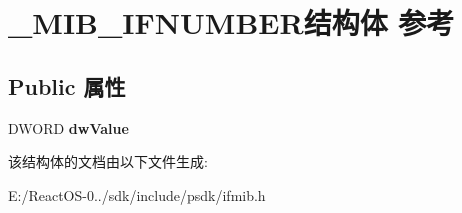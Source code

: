 \hypertarget{struct___m_i_b___i_f_n_u_m_b_e_r}{}\section{\+\_\+\+M\+I\+B\+\_\+\+I\+F\+N\+U\+M\+B\+E\+R结构体 参考}
\label{struct___m_i_b___i_f_n_u_m_b_e_r}
\subsection*{Public 属性}
\begin{DoxyCompactItemize}
\item 
\mbox{\label{struct___m_i_b___i_f_n_u_m_b_e_r_aff4c02cd7c7302eb97072c01867913cc}} 
D\+W\+O\+RD {\bfseries dw\+Value}
\end{DoxyCompactItemize}


该结构体的文档由以下文件生成\+:\begin{DoxyCompactItemize}
\item 
E\+:/\+React\+O\+S-\/0../sdk/include/psdk/ifmib.\+h\end{DoxyCompactItemize}
